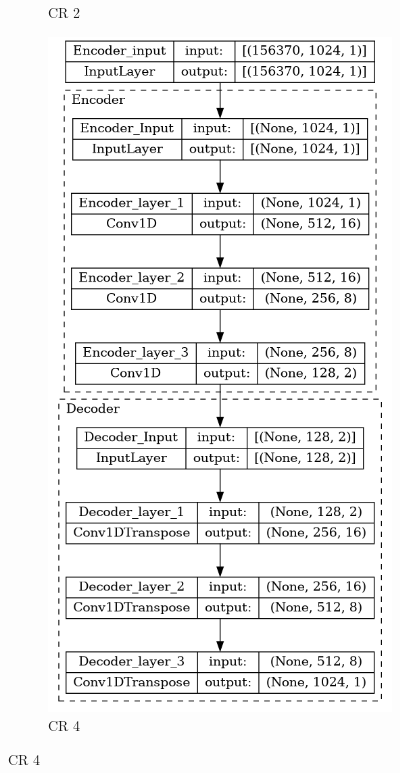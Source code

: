 \begin{appendices}
\begin{figure}
\begin{subfigure}{.5\textwidth}
			\caption{CR 2}
		\end{subfigure}
		\begin{subfigure}{.5\textwidth}
			\includegraphics[width=\linewidth]{../../Images/CR_4.png}
			\caption{CR 4}
		\end{subfigure}
	\end{figure}

\end{appendices}
